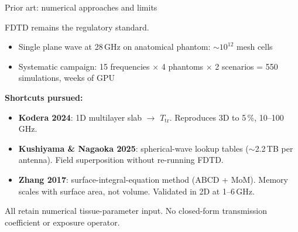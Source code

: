 \begin{frame}[label=app-lit-numerical]{Prior art: numerical approaches and limits}

  FDTD remains the regulatory standard.

  \vspace{6pt}
  {\small
  \begin{itemize}
    \item Single plane wave at 28\,GHz on anatomical phantom: ${\sim}10^{12}$ mesh cells
    \item Systematic campaign: 15 frequencies $\times$ 4 phantoms $\times$ 2 scenarios = 550 simulations, weeks of GPU
  \end{itemize}
  }

  \vspace{6pt}
  \textbf{Shortcuts pursued:}

  {\small
  \begin{itemize}
    \item \textbf{Kodera 2024}: 1D multilayer slab $\rightarrow$ $T_{\mathrm{tr}}$. Reproduces 3D to 5\,\%, 10--100\,GHz.
    \item \textbf{Kushiyama \& Nagaoka 2025}: spherical-wave lookup tables (${\sim}$2.2\,TB per antenna). Field superposition without re-running FDTD.
    \item \textbf{Zhang 2017}: surface-integral-equation method (ABCD + MoM). Memory scales with surface area, not volume. Validated in 2D at 1--6\,GHz.
  \end{itemize}
  }

  \vspace{6pt}
  All retain numerical tissue-parameter input. No closed-form transmission coefficient or exposure operator.

  \vspace{4pt}
\end{frame}
